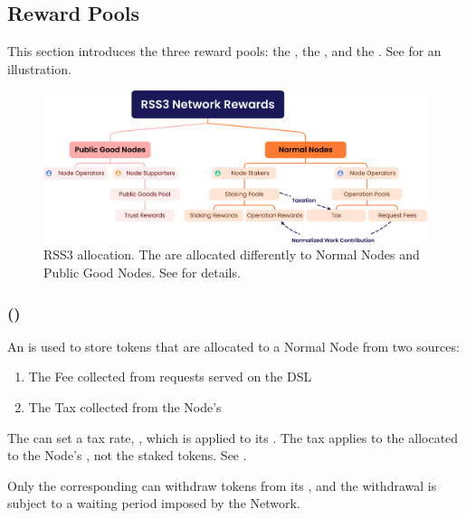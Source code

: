 \subsection{Reward Pools}
\label{subsec:reward_pools}

This section introduces the three reward pools: the , the , and the . See  for an illustration.

    {
        \begin{figure}[htb!]
            \centering
            \includegraphics[width=\linewidth]{figures/network-rewards.png}
            \caption{RSS3  allocation.
                The  are allocated differently to Normal Nodes and Public Good Nodes.
                See  for details.}
            \label{fig:network-rewards}
        \end{figure}
    }

\subsubsection{ (\operationPool)}
\label{subsubsec:operation_pool}

An  is used to store tokens that are allocated to a Normal Node from two sources:
\begin{enumerate}
    \item The \gls{Fee} collected from requests served on the \gls{DSL}
    \item The \gls{Tax} collected from the Node's \stakingPool
\end{enumerate}

The  can set a tax rate, \taxRate, which is applied to its \stakingPool.
The tax applies to the  allocated to the Node's \stakingPool, not the staked tokens. See .

Only the corresponding  can withdraw tokens from its \operationPool, and the withdrawal is subject to a waiting period imposed by the Network.

